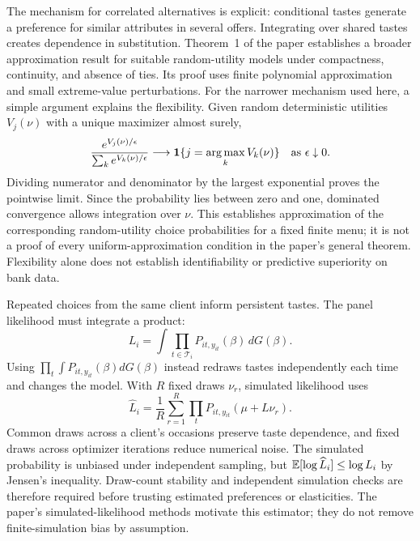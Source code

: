 The mechanism for correlated alternatives is explicit: conditional tastes generate a preference for similar attributes in several offers. Integrating over shared tastes creates dependence in substitution. Theorem~1 of the paper establishes a broader approximation result for suitable random-utility models under compactness, continuity, and absence of ties. Its proof uses finite polynomial approximation and small extreme-value perturbations. For the narrower mechanism used here, a simple argument explains the flexibility. Given random deterministic utilities $V_j(\nu)$ with a unique maximizer almost surely,
\begin{equation}
\frac{e^{V_j(\nu)/\epsilon}}{\sum_ke^{V_k(\nu)/\epsilon}}
\longrightarrow\mathbf 1\{j=\operatorname*{arg\,max}_kV_k(\nu)\}
\quad\text{as }\epsilon\downarrow0.
\end{equation}
Dividing numerator and denominator by the largest exponential proves the pointwise limit. Since the probability lies between zero and one, dominated convergence allows integration over $\nu$. This establishes approximation of the corresponding random-utility choice probabilities for a fixed finite menu; it is not a proof of every uniform-approximation condition in the paper's general theorem. Flexibility alone does not establish identifiability or predictive superiority on bank data.

Repeated choices from the same client inform persistent tastes. The panel likelihood must integrate a product:
\begin{equation}
L_i=\int\prod_{t\in\mathcal T_i}
P_{it,y_{it}}(\beta)\,dG(\beta).
\label{eq:panellik}
\end{equation}
Using $\prod_t\int P_{it,y_{it}}(\beta)dG(\beta)$ instead redraws tastes independently each time and changes the model. With $R$ fixed draws $\nu_r$, simulated likelihood uses
\begin{equation}
\widehat L_i=\frac1R\sum_{r=1}^R
\prod_tP_{it,y_{it}}(\mu+L\nu_r).
\end{equation}
Common draws across a client's occasions preserve taste dependence, and fixed draws across optimizer iterations reduce numerical noise. The simulated probability is unbiased under independent sampling, but $\mathbb E[\log\widehat L_i]\leq\log L_i$ by Jensen's inequality. Draw-count stability and independent simulation checks are therefore required before trusting estimated preferences or elasticities. The paper's simulated-likelihood methods motivate this estimator; they do not remove finite-simulation bias by assumption.

